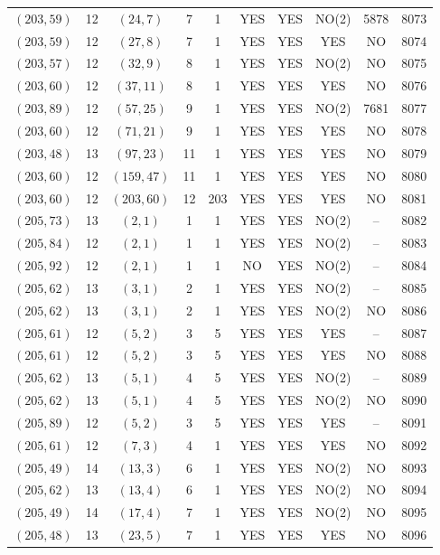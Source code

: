 \begin{longtable}{|c|c|c|c|c|c|c|c|c|c|}
$(203, 59)$ & 12 & $(24, 7)$ & 7 & 1 & YES & YES & NO(2) & 5878 & 8073\\
$(203, 59)$ & 12 & $(27, 8)$ & 7 & 1 & YES & YES & YES & NO & 8074\\
$(203, 57)$ & 12 & $(32, 9)$ & 8 & 1 & YES & YES & NO(2) & NO & 8075\\
$(203, 60)$ & 12 & $(37, 11)$ & 8 & 1 & YES & YES & YES & NO & 8076\\
$(203, 89)$ & 12 & $(57, 25)$ & 9 & 1 & YES & YES & NO(2) & 7681 & 8077\\
$(203, 60)$ & 12 & $(71, 21)$ & 9 & 1 & YES & YES & YES & NO & 8078\\
$(203, 48)$ & 13 & $(97, 23)$ & 11 & 1 & YES & YES & YES & NO & 8079\\
$(203, 60)$ & 12 & $(159, 47)$ & 11 & 1 & YES & YES & YES & NO & 8080\\
$(203, 60)$ & 12 & $(203, 60)$ & 12 & 203 & YES & YES & YES & NO & 8081\\
$(205, 73)$ & 13 & $(2, 1)$ & 1 & 1 & YES & YES & NO(2) & -- & 8082\\
$(205, 84)$ & 12 & $(2, 1)$ & 1 & 1 & YES & YES & NO(2) & -- & 8083\\
$(205, 92)$ & 12 & $(2, 1)$ & 1 & 1 & NO & YES & NO(2) & -- & 8084\\
$(205, 62)$ & 13 & $(3, 1)$ & 2 & 1 & YES & YES & NO(2) & -- & 8085\\
$(205, 62)$ & 13 & $(3, 1)$ & 2 & 1 & YES & YES & NO(2) & NO & 8086\\
$(205, 61)$ & 12 & $(5, 2)$ & 3 & 5 & YES & YES & YES & -- & 8087\\
$(205, 61)$ & 12 & $(5, 2)$ & 3 & 5 & YES & YES & YES & NO & 8088\\
$(205, 62)$ & 13 & $(5, 1)$ & 4 & 5 & YES & YES & NO(2) & -- & 8089\\
$(205, 62)$ & 13 & $(5, 1)$ & 4 & 5 & YES & YES & NO(2) & NO & 8090\\
$(205, 89)$ & 12 & $(5, 2)$ & 3 & 5 & YES & YES & YES & -- & 8091\\
$(205, 61)$ & 12 & $(7, 3)$ & 4 & 1 & YES & YES & YES & NO & 8092\\
$(205, 49)$ & 14 & $(13, 3)$ & 6 & 1 & YES & YES & NO(2) & NO & 8093\\
$(205, 62)$ & 13 & $(13, 4)$ & 6 & 1 & YES & YES & NO(2) & NO & 8094\\
$(205, 49)$ & 14 & $(17, 4)$ & 7 & 1 & YES & YES & NO(2) & NO & 8095\\
$(205, 48)$ & 13 & $(23, 5)$ & 7 & 1 & YES & YES & YES & NO & 8096\\

\end{longtable}
